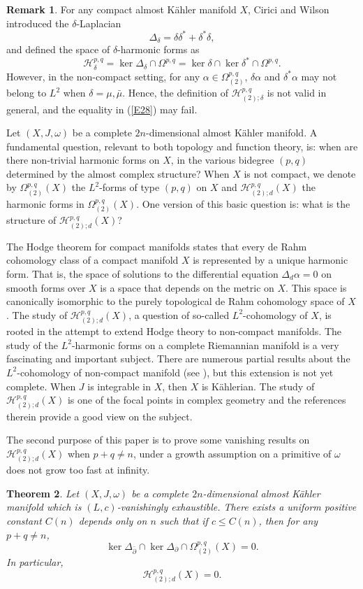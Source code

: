 \documentclass[12pt, twoside]{article}
\newtheorem{theorem}{Theorem}[section]
\theoremstyle{definition}
\newtheorem{remark}[theorem]{Remark}
\numberwithin{equation}{section}
\def \a {\alpha }
\def \de {\delta}
\def \De {\Delta}
\def\w {\omega}
\def\Om{\Omega}
\def\pa{\partial}
\begin{document}
	\begin{remark}
		For any compact almost K\"{a}hler manifold $X$, Cirici and Wilson \cite{CW20} introduced the  $\de$-Laplacian
		$$\De_{\de}=\de\de^{\ast}+\de^{\ast}\de,$$
		and defined the space of $\de$-harmonic forms as
		\begin{equation}\label{E28}
		\mathcal{H}^{p,q}_{\de}=\ker\De_{\de}\cap\Om^{p,q}=\ker\de\cap\ker\de^{\ast}\cap\Om^{p,q}.
		\end{equation}
	 However, in the non-compact setting, for any $\a\in\Om^{p,q}_{(2)}$, $\de\a$ and $\de^{\ast}\a$ may not belong to $L^{2}$ when $\de=\mu,\bar{\mu}$. Hence, the definition of   $\mathcal{H}^{p,q}_{(2);\de}$ is not valid in general, and the equality in (\ref{E28}) may fail.
	\end{remark}
	Let $(X,J,\w)$ be a complete $2n$-dimensional almost K\"{a}hler manifold. A fundamental question, relevant to both topology and function theory, is:  when are there non-trivial harmonic forms on $X$, in the various bidegree $(p,q)$ determined by the almost complex structure? When $X$ is not compact, we denote by $\Om^{p,q}_{(2)}(X)$ the $L^{2}$-forms of type $(p,q)$ on $X$ and $\mathcal{H}^{p,q}_{(2);d}(X)$ the harmonic forms in $\Om^{p,q}_{(2)}(X)$. One version of this basic question is: what is the structure of $\mathcal{H}^{p,q}_{(2);d}(X)$?
	
	The Hodge theorem for compact manifolds states that every de Rahm cohomology class of a compact manifold $X$ is represented by a unique harmonic form. That is, the space of solutions to the differential equation $\De_{d}\a=0$ on smooth forms over $X$ is a space that depends on the metric on $X$. This space is canonically isomorphic to the purely topological de Rahm cohomology space of $X$. The study of $\mathcal{H}^{p,q}_{(2);d}(X)$, a question of so-called $L^{2}$-cohomology of $X$, is rooted in the attempt to extend Hodge theory to non-compact manifolds. The study of the $L^{2}$-harmonic forms on a complete Riemannian manifold is a very  fascinating and important subject.  There are numerous partial results about the $L^{2}$-cohomology of non-compact manifold (see \cite{And,Car,Dod}), but this extension is not yet complete.  When $J$ is integrable in $X$, then $X$ is K\"{a}hlerian. The study of $\mathcal{H}^{p,q}_{(2);d}(X)$ is one of the focal points in complex geometry \cite{CF,Don94,Don97,DF,Gro,McN02,McN03} and the references therein provide a good view on the subject.
	
	The second purpose of this paper is to prove some vanishing results on $\mathcal{H}^{p,q}_{(2);d}(X)$ when $p+q\neq n$, 
	under a growth assumption on a primitive of $\w$ does not grow too fast at infinity. 
	\begin{theorem}\label{T2}
		Let $(X,J,\w)$ be a complete $2n$-dimensional almost K\"{a}hler manifold which is $(L,c)$-vanishingly exhaustible. There exists a uniform positive constant $C(n)$  depends only on $n$ such that if $c\leq C(n)$, then for any $p+q\neq n$,
		$$\ker{\De_{\bar{\pa}}}\cap\ker{\De_{\pa}}\cap\Om^{p,q}_{(2)}(X)=0.$$
		In particular,
		$$\mathcal{H}^{p,q}_{(2);d}(X)=0.$$
	\end{theorem}
\end{document}
